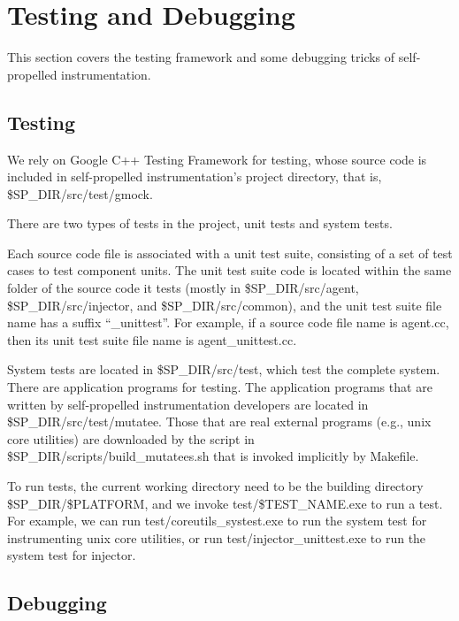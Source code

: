 \section{Testing and Debugging}
This section covers the testing framework and some debugging tricks of
self-propelled instrumentation.
\subsection{Testing}
We rely on Google C++ Testing Framework for testing, whose source code is
included in self-propelled instrumentation's project directory, that is,
\$SP\_DIR/src/test/gmock.

There are two types of tests in the project, unit tests and system tests.

Each source code file is associated with a unit test suite, consisting of a set
of test cases to test component units.
The unit test suite code is located within the same folder of the source code it
tests (mostly in \$SP\_DIR/src/agent, \$SP\_DIR/src/injector, and
\$SP\_DIR/src/common), and the unit test suite file name has a suffix
``\_unittest''.
For example, if a source code file name is agent.cc, then its unit test suite
file name is agent\_unittest.cc.

System tests are located in \$SP\_DIR/src/test, which test the complete system.
There are application programs for testing.
The application programs that are written by self-propelled instrumentation
developers are located in \$SP\_DIR/src/test/mutatee.
Those that are real external programs (e.g., unix core utilities) are downloaded
by the script in \$SP\_DIR/scripts/build\_mutatees.sh that is invoked implicitly
by Makefile.

To run tests, the current working directory need to be the building directory
\$SP\_DIR/\$PLATFORM, and we invoke test/\$TEST\_NAME.exe to run a test.
For example, we can run test/coreutils\_systest.exe to run the system test for
instrumenting unix core utilities, or run test/injector\_unittest.exe to run the
system test for injector.

\subsection{Debugging}

